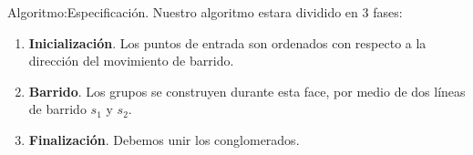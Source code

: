 
\begin{frame}[fragile]{Algoritmo:}{Especificación.}
  Nuestro algoritmo estara dividido en 3 fases:
  \begin{enumerate}
  \item \textbf{Inicialización}. Los puntos de entrada son ordenados
    con respecto a la dirección del movimiento de barrido.
  \item \textbf{Barrido}. Los grupos se construyen durante esta face, por medio
    de dos líneas de barrido $s_1$ y $s_2$.
  \item \textbf{Finalización}. Debemos unir los conglomerados.
  \end{enumerate}
\end{frame}
